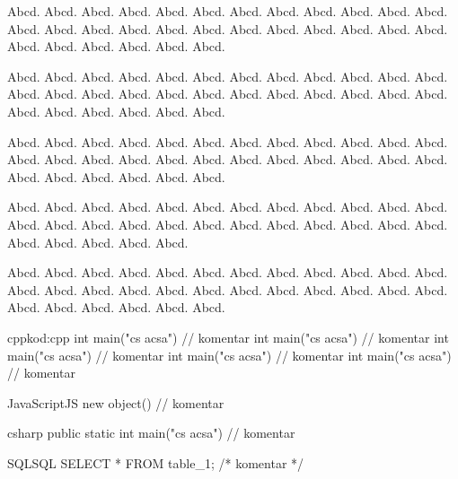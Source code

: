 \documentclass[
  biblatex,
  glossaries,
  index
]{kidiplom}
\begin{document}
\begin{remark}
  Abcd. Abcd. Abcd. Abcd. Abcd. Abcd. Abcd. Abcd. Abcd. Abcd. Abcd. Abcd. Abcd. Abcd. Abcd. Abcd. Abcd. Abcd. Abcd. Abcd. Abcd. Abcd. Abcd. Abcd. Abcd. Abcd. Abcd. Abcd. Abcd. Abcd.
\end{remark}

\begin{example}
  Abcd. Abcd. Abcd. Abcd. Abcd. Abcd. Abcd. Abcd. Abcd. Abcd. Abcd. Abcd. Abcd. Abcd. Abcd. Abcd. Abcd. Abcd. Abcd. Abcd. Abcd. Abcd. Abcd. Abcd. Abcd. Abcd. Abcd. Abcd. Abcd. Abcd.
\end{example}

\begin{lemma}
  Abcd. Abcd. Abcd. Abcd. Abcd. Abcd. Abcd. Abcd. Abcd. Abcd. Abcd. Abcd. Abcd. Abcd. Abcd. Abcd. Abcd. Abcd. Abcd. Abcd. Abcd. Abcd. Abcd. Abcd. Abcd. Abcd. Abcd. Abcd. Abcd. Abcd.
\end{lemma}

\begin{consequence}
  Abcd. Abcd. Abcd. Abcd. Abcd. Abcd. Abcd. Abcd. Abcd. Abcd. Abcd. Abcd. Abcd. Abcd. Abcd. Abcd. Abcd. Abcd. Abcd. Abcd. Abcd. Abcd. Abcd. Abcd. Abcd. Abcd. Abcd. Abcd. Abcd.
\end{consequence}

\begin{theorem}
  Abcd. Abcd. Abcd. Abcd. Abcd. Abcd. Abcd. Abcd. Abcd. Abcd. Abcd. Abcd. Abcd. Abcd. Abcd. Abcd. Abcd. Abcd. Abcd. Abcd. Abcd. Abcd. Abcd. Abcd. Abcd. Abcd. Abcd. Abcd. Abcd. Abcd.
\end{theorem}


\begin{kicode}{cpp}{kod:cpp}{\cpp}
  int main("cs acsa") // komentar
  int main("cs acsa") // komentar
  int main("cs acsa") // komentar
  int main("cs acsa") // komentar
  int main("cs acsa") // komentar
\end{kicode}

\begin{kicode}{JavaScript}{}{JS}
  new object() // komentar
\end{kicode}

\begin{kicode}{csharp}{}{\csharp}
  public static int main("cs acsa") // komentar
\end{kicode}

\begin{kicode}{SQL}{}{SQL}
  SELECT * FROM table_1; /* komentar */
\end{kicode}
\end{document}
